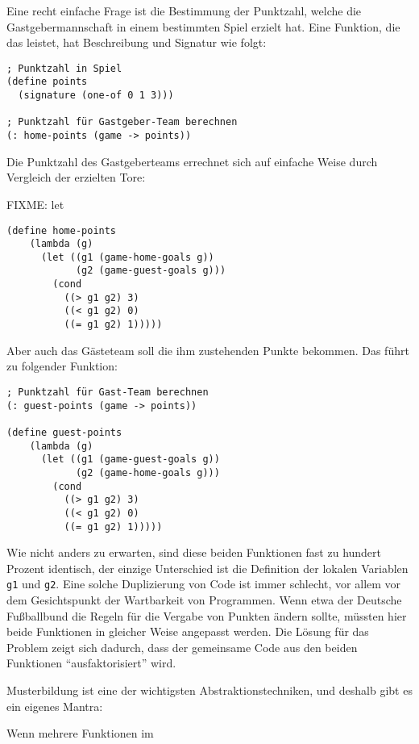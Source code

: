 Eine recht einfache Frage ist die Bestimmung der Punktzahl, welche die
Gastgebermannschaft in einem bestimmten Spiel erzielt hat. Eine Funktion, die
das leistet, hat Beschreibung und Signatur wie
folgt:

\begin{verbatim}
; Punktzahl in Spiel
(define points
  (signature (one-of 0 1 3)))

; Punktzahl für Gastgeber-Team berechnen
(: home-points (game -> points))
\end{verbatim}
Die Punktzahl des Gastgeberteams errechnet sich auf einfache Weise durch
Vergleich der erzielten Tore:

FIXME: let

\begin{verbatim}
(define home-points
    (lambda (g)
      (let ((g1 (game-home-goals g))
            (g2 (game-guest-goals g)))
        (cond
          ((> g1 g2) 3)
          ((< g1 g2) 0)
          ((= g1 g2) 1)))))
\end{verbatim}
Aber auch das Gästeteam soll die ihm zustehenden Punkte bekommen. Das führt zu
folgender Funktion:
\begin{verbatim}
; Punktzahl für Gast-Team berechnen
(: guest-points (game -> points))

(define guest-points
    (lambda (g)
      (let ((g1 (game-guest-goals g))
            (g2 (game-home-goals g)))
        (cond
          ((> g1 g2) 3)
          ((< g1 g2) 0)
          ((= g1 g2) 1)))))
\end{verbatim}
Wie nicht anders zu erwarten, sind diese beiden Funktionen fast zu hundert
Prozent identisch, der einzige Unterschied ist die Definition der lokalen
Variablen \texttt{g1} und \texttt{g2}. Eine solche Duplizierung von Code ist
immer schlecht, vor allem vor dem Gesichtspunkt der Wartbarkeit von
Programmen. Wenn etwa der Deutsche Fußballbund die Regeln für die Vergabe von
Punkten ändern sollte, müssten hier beide Funktionen in gleicher Weise
angepasst werden.  Die Lösung für das Problem zeigt sich dadurch, dass der
gemeinsame Code aus den beiden Funktionen "`ausfaktorisiert"' wird. 

Musterbildung ist eine der wichtigsten Abstraktionstechniken, und deshalb gibt
es ein eigenes Mantra:

\begin{mantra}\label{mantra:abstraction} Wenn mehrere Funktionen im
  
\end{mantra}

